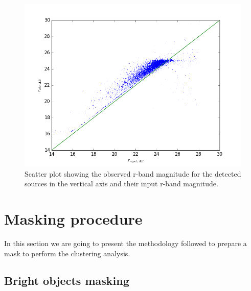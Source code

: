 \documentclass[\docopts]{\docclass}
\begin{document}
\begin{figure}
\centering
\includegraphics[width=0.9\columnwidth]{mag_scatter.png}
\caption{Scatter plot showing the observed r-band magnitude for the detected sources in the vertical axis and their input r-band magnitude.}
\label{fig:basic_tests}
\end{figure}


\section{Masking procedure}
\label{sec:masking}

In this section we are going to present the methodology followed to prepare a mask to perform the clustering analysis.

\subsection{Bright objects masking}
\end{document}

